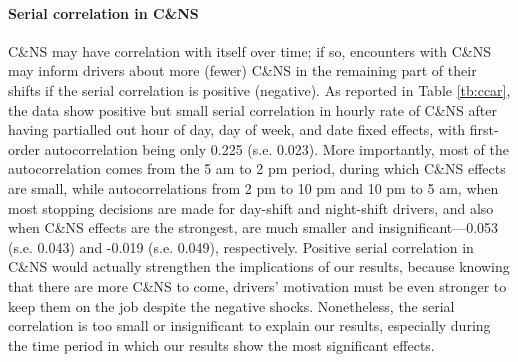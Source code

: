 \documentclass[reviewmode,AEJ]{AEA}
\begin{document}



\paragraph{Serial correlation in C\&NS} C\&NS may have correlation with itself over time; if so, encounters
with C\&NS may inform drivers about more (fewer) C\&NS in the remaining part of their shifts if the serial 
correlation is positive (negative). As reported in Table \ref{tb:ccar}, the data show positive but small 
serial correlation in hourly rate of C\&NS after having partialled out hour of day, day of week, and date 
fixed effects, with first-order autocorrelation being only 0.225 (s.e. 0.023). More importantly, most of 
the autocorrelation comes from the 5 am to 2 pm period, during which C\&NS effects are small, while 
autocorrelations from 2 pm to 10 pm and 10 pm to 5 am, when most stopping decisions are made for day-shift
and night-shift drivers, and also when C\&NS effects are the strongest, are much smaller and insignificant---0.053
(s.e. 0.043) and -0.019 (s.e. 0.049), respectively. Positive serial correlation in C\&NS would actually strengthen
the implications of our results, because knowing that there are more C\&NS to come, drivers' motivation must 
be even stronger to keep them on the job despite the negative shocks. Nonetheless, the serial correlation is
too small or insignificant to explain our results, especially during the time period in which our results 
show the most significant effects.
\end{document}
